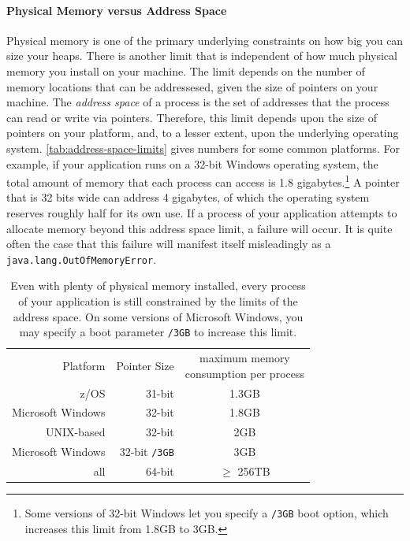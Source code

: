 \paragraph{Physical Memory versus Address Space}
Physical memory is one of the primary underlying constraints on how big you can
size your heaps. There is another limit that is independent of how much physical
memory you install on your machine. The limit depends on the number of memory
locations that can be addressesed, given the size of pointers on your machine.
The \emph{address space} of a process is the set of addresses that the process
can read or write via pointers. Therefore, this limit depends upon the size of
pointers on your platform, and, to a lesser extent, upon the underlying
operating system. \autoref{tab:address-space-limits} gives numbers for
some common platforms. For example, if your application runs on a 32-bit Windows
operating system, the total amount of memory that each process can access is 1.8
gigabytes.\footnote{Some versions of 32-bit Windows let you specify a {\tt /3GB}
boot option, which increases this limit from 1.8GB to 3GB.} A pointer that is 32
bits wide can address 4 gigabytes, of which the operating system reserves
roughly half for its own use. If a process of your application attempts to
allocate memory beyond this address space limit, a failure will occur. It is
quite often the case that this failure will manifest itself misleadingly as a
{\tt java.lang.OutOfMemoryError}.

\begin{table}
\centering
\begin{tabular}{rrc}
\toprule
Platform & Pointer Size & \shortstack{maximum memory\\consumption per process}
\\ \cmidrule(r){1-2} \cmidrule(l){3-3}
z/OS & 31-bit & 1.3GB \\
Microsoft Windows & 32-bit & 1.8GB \\
UNIX-based & 32-bit & 2GB \\
Microsoft Windows & 32-bit {\tt /3GB} & 3GB \\
all & 64-bit & $\ge$ 256TB \\
\bottomrule
\end{tabular}
\caption{Even with plenty of physical memory installed, every process of your
application is still constrained 
  by the limits of the address space. On some versions of Microsoft Windows, you
  may specify a boot parameter {\tt /3GB} to increase this limit.}
\label{tab:address-space-limits}
\end{table}

